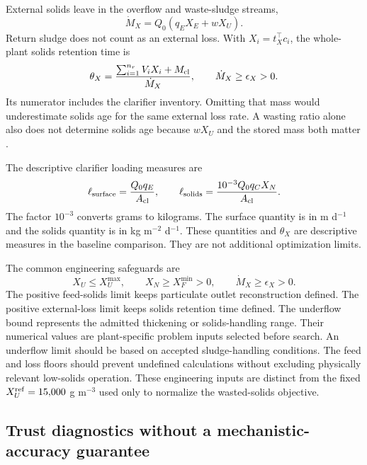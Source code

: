 External solids leave in the overflow and waste-sludge streams,
\begin{equation}
\dot M_X=Q_0(q_EX_E+wX_U).
\label{eq:plant_external_solids_loss}
\end{equation}
Return sludge does not count as an external loss. With $X_i=t_X^\top c_i$, the whole-plant solids retention time is
\begin{equation}
\theta_X=\frac{\sum_{i=1}^{n_r}V_iX_i+M_{\rm cl}}{\dot M_X},
\qquad\dot M_X\ge\epsilon_X>0.
\label{eq:plant_solids_age}
\end{equation}
Its numerator includes the clarifier inventory. Omitting that mass would underestimate solids age for the same external loss rate. A wasting ratio alone also does not determine solids age because $wX_U$ and the stored mass both matter \citep{Alex2008}.

The descriptive clarifier loading measures are
\begin{equation}
\ell_{\rm surface}=\frac{Q_0q_E}{A_{\rm cl}},\qquad
\ell_{\rm solids}=\frac{10^{-3}Q_0q_CX_N}{A_{\rm cl}}.
\label{eq:plant_loading_measures}
\end{equation}
The factor $10^{-3}$ converts grams to kilograms. The surface quantity is in m d$^{-1}$ and the solids quantity is in kg m$^{-2}$ d$^{-1}$. These quantities and $\theta_X$ are descriptive measures in the baseline comparison. They are not additional optimization limits.

The common engineering safeguards are
\begin{equation}
X_U\le X_U^{\max},\qquad X_N\ge X_F^{\min}>0,\qquad
\dot M_X\ge\epsilon_X>0.
\label{eq:plant_engineering_safeguards}
\end{equation}
The positive feed-solids limit keeps particulate outlet reconstruction defined. The positive external-loss limit keeps solids retention time defined. The underflow bound represents the admitted thickening or solids-handling range. Their numerical values are plant-specific problem inputs selected before search. An underflow limit should be based on accepted sludge-handling conditions. The feed and loss floors should prevent undefined calculations without excluding physically relevant low-solids operation. These engineering inputs are distinct from the fixed $X_U^{\rm ref}=15{,}000$ g m$^{-3}$ used only to normalize the wasted-solids objective.

\subsection{Trust diagnostics without a mechanistic-accuracy guarantee}

